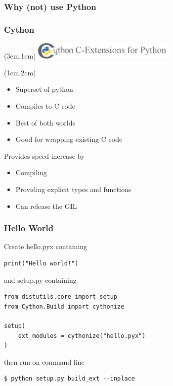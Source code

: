 \documentclass[xcolor=pdftex,dvipsnames]{beamer}
\begin{document}
\begin{frame}
  \frametitle{Why (not) use Python}
\end{frame}


\begin{frame}[t]
    \frametitle{Cython}
    \begin{textblock*}{7cm}(3cm,1cm) %
    \includegraphics[width=7cm]{cython_logo}
    \end{textblock*}
    \begin{textblock*}{12cm}(1cm,2cm) %
    \begin{itemize}
      \item Superset of python
      \item Compiles to C code
      \item Best of both worlds
      \item Good for wrapping existing C code
    \end{itemize}
    Provides speed increase by
    \begin{itemize}
      \item Compiling
      \item Providing explicit types and functions
      \item Can release the GIL
    \end{itemize}
    \end{textblock*}
\end{frame}


\begin{frame}[fragile]
  \frametitle{Hello World}
  Create hello.pyx containing
  \begin{verbatim}
print("Hello world!")
  \end{verbatim}
  and setup.py containing
  \begin{verbatim}
from distutils.core import setup
from Cython.Build import cythonize

setup(
    ext_modules = cythonize("hello.pyx")
)
  \end{verbatim}
  then run on command line
  \begin{verbatim}
$ python setup.py build_ext --inplace
  \end{verbatim}

\end{frame}
\end{document}
